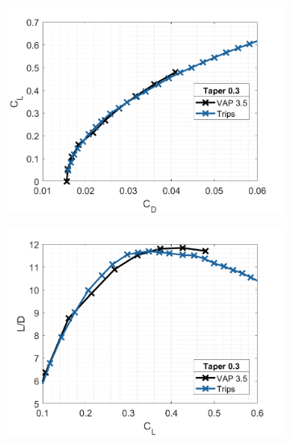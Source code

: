 \begin{figure}[H]
     \centering
     \begin{subfigure}[b]{0.45\textwidth}
         \centering
         \includegraphics[width=\textwidth]{05_Results/Figs/VAP/genMAV/taper5a.png}
        \label{fig:morelabel}
     \end{subfigure}
     \hfill
     \begin{subfigure}[b]{0.45\textwidth}
         \centering
         \includegraphics[width=\textwidth]{05_Results/Figs/VAP/genMAV/taper5b.png}
         \label{fig:forlabel}
      
     \end{subfigure}
     \hfill

        
\end{figure}


